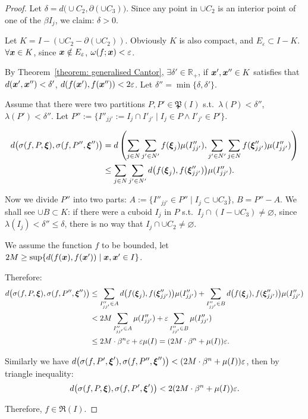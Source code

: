 \documentclass[openany]{book}
\begin{document}
\begin{proof}
	Let $\delta = d\big(\cup C_2, \partial (\cup C_3)\big)$. 
	Since any point in $\cup C_2$ is an interior point of one of the $\beta I_j$, we claim: $\delta > 0$.

	Let $K = I - (\cup C_2 - \partial (\cup C_2))$. Obviously $K$ is also compact, and $E_\varepsilon \subset I - K$. $\forall \boldsymbol{x} \in K$, since $\boldsymbol{x} \notin E_\varepsilon$, $\omega(f; \boldsymbol{x}) < \varepsilon$.

	By Theorem~\ref{theorem: generalised Cantor}, $\exists \delta' \in \mathbb R_+$, if $\boldsymbol{x}', \boldsymbol{x}'' \in K$ satisfies that $d(\boldsymbol{x}', \boldsymbol{x}'') < \delta'$, $d(f(\boldsymbol{x}'), f(\boldsymbol{x}'')) < 2\varepsilon$. 
	Let $\delta'' = \min\{\delta, \delta'\}$.

	Assume that there were two partitions $P, P' \in \mathfrak P(I)$ s.t.\ $\lambda(P) < \delta''$, $\lambda(P') < \delta''$. Let $P'' := \{I''_{jj'} := I_j \cap I'_{j'} \mid I_j \in P \wedge I'_{j'} \in P'\}$.

	\begin{align*}
		d\big(\sigma(f, P, \boldsymbol{\xi}), \sigma(f, P'', \boldsymbol{\xi}'')\big)
			&= d\left( 
				\sum_{j \in N} \sum_{j' \in N'} f(\boldsymbol{\xi}_j) \mu(I''_{jj'}), \sum_{j' \in N'}\sum_{j \in N} f(\boldsymbol{\xi}''_{jj'}) \mu(I''_{jj'})
			 \right)
		\\
		&\leq \sum_{j \in N} \sum_{j' \in N'} d\big(f(\boldsymbol{\xi}_j), f(\boldsymbol{\xi}''_{jj'})\big) 
			\mu(I''_{jj'}).
	\end{align*}

	Now we divide $P''$ into two parts: $A := \{I''_{jj'} \in P'' \mid I_j \subset \cup C_3\}$, $B = P'' - A$. 
	We shall see $\cup B \subset K$: if there were a cuboid $I_j$ in $P$ s.t.\ $I_j \cap (I - \cup C_3) \neq \varnothing$, since $\lambda(I_j) < \delta'' \leq \delta$, there is no way that $I_j \cap \cup C_2 \neq \varnothing$.

	We assume the function $f$ to be bounded, let $2M \geq \sup \{d(f(\boldsymbol{x}), f(\boldsymbol{x}')) \mid \boldsymbol{x}, \boldsymbol{x}' \in I\}$.

	Therefore:
	\begin{align*}
		d\big(\sigma(f, P, \boldsymbol{\xi}), \sigma(f, P'', \boldsymbol{\xi}'')\big)
		&\leq \sum_{I''_{jj'} \in A} d\big(f(\boldsymbol{\xi}_j), f(\boldsymbol{\xi}''_{jj'})\big) \mu(I''_{jj'})
			+ \sum_{I''_{jj'} \in B} d\big(f(\boldsymbol{\xi}_j), f(\boldsymbol{\xi}''_{jj'})\big) \mu(I''_{jj'})
		\\
		&<  2 M \sum_{I''_{jj'} \in A} \mu(I''_{jj'}) + \varepsilon \sum_{I''_{jj'} \in B} \mu(I''_{jj'})
		\\
		&\leq 2M \cdot \beta^n \varepsilon + \varepsilon \mu(I)
		=  ( 2M \cdot \beta^n + \mu(I)) \varepsilon.
	\end{align*}

	Similarly we have $d\big(\sigma(f, P', \boldsymbol{\xi}'), \sigma(f, P'', \boldsymbol{\xi}'')\big) < ( 2M \cdot \beta^n + \mu(I)) \varepsilon$, then by triangle inequality:
	\begin{equation*}
		d\big(\sigma(f, P, \boldsymbol{\xi}), \sigma(f, P', \boldsymbol{\xi}')\big) < 2( 2M \cdot \beta^n + \mu(I)) \varepsilon.
	\end{equation*}

	Therefore, $f \in \mathfrak R(I)$.
\end{proof}
\end{document}
